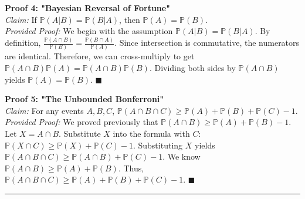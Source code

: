 \documentclass[12pt]{article}
\theoremstyle{definition}
\theoremstyle{remark}
\begin{document}
\textbf{Proof 4: "Bayesian Reversal of Fortune"} \\
\textit{Claim:} If $\mathbb{P}(A|B) = \mathbb{P}(B|A)$, then $\mathbb{P}(A) = \mathbb{P}(B)$. \\
\textit{Provided Proof:} We begin with the assumption $\mathbb{P}(A|B) = \mathbb{P}(B|A)$. By definition, $\frac{\mathbb{P}(A \cap B)}{\mathbb{P}(B)} = \frac{\mathbb{P}(B \cap A)}{\mathbb{P}(A)}$. Since intersection is commutative, the numerators are identical. Therefore, we can cross-multiply to get $\mathbb{P}(A \cap B)\mathbb{P}(A) = \mathbb{P}(A \cap B)\mathbb{P}(B)$. Dividing both sides by $\mathbb{P}(A \cap B)$ yields $\mathbb{P}(A) = \mathbb{P}(B)$. $\blacksquare$

\textbf{Proof 5: "The Unbounded Bonferroni"} \\
\textit{Claim:} For any events $A, B, C$, $\mathbb{P}(A \cap B \cap C) \ge \mathbb{P}(A) + \mathbb{P}(B) + \mathbb{P}(C) - 1$. \\
\textit{Provided Proof:} We proved previously that $\mathbb{P}(A \cap B) \ge \mathbb{P}(A) + \mathbb{P}(B) - 1$. Let $X = A \cap B$. Substitute $X$ into the formula with $C$: $\mathbb{P}(X \cap C) \ge \mathbb{P}(X) + \mathbb{P}(C) - 1$. Substituting $X$ yields $\mathbb{P}(A \cap B \cap C) \ge \mathbb{P}(A \cap B) + \mathbb{P}(C) - 1$. We know $\mathbb{P}(A \cap B) \ge \mathbb{P}(A) + \mathbb{P}(B)$. Thus, $\mathbb{P}(A \cap B \cap C) \ge \mathbb{P}(A) + \mathbb{P}(B) + \mathbb{P}(C) - 1$. $\blacksquare$

\vspace{1em}
\hrule
\vspace{1em}
\end{document}
